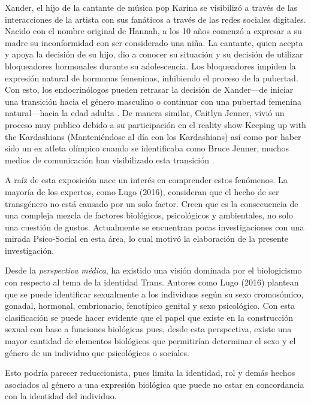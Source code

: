 Xander, el hijo de la cantante de música pop Karina se visibilizó a través de
las interacciones de la artista con sus fanáticos a través de las redes sociales
digitales. Nacido con el nombre original de Hannah, a los 10 años comenzó a
expresar a su madre su inconformidad con ser considerado una niña. La cantante,
quien acepta y apoya la decisión de su hijo, dio a conocer su situación y su
decisión de utilizar bloqueadores hormonales durante su adolescencia. Los
bloqueadores impiden la expresión natural de hormonas femeninas, inhibiendo el
proceso de la pubertad. Con esto, los endocrinólogos pueden retrasar la decisión
de Xander—de iniciar una transición hacia el género masculino o continuar con
una pubertad femenina natural—hacia la edad adulta
\parencites{Alvarado2016,Vistazo2017}. De manera similar, Caitlyn Jenner, vivió
un proceso muy publico debido a su participación en el reality show Keeping up
with the Kardashians (Manteniéndose al día con los Kardashians) así como por
haber sido un ex atleta olímpico cuando se identificaba como Bruce Jenner,
muchos medios de comunicación han visibilizado esta transición
\parencite{Castro2015}.

A raíz de esta exposición nace un interés en comprender estos fenómenos.
La mayoría de los expertos, como Lugo (2016), consideran que el hecho de ser
transgénero no está causado por un solo factor.
Creen que es la consecuencia de una compleja mezcla de factores biológicos,
psicológicos y ambientales, no solo una cuestión de gustos.
Actualmente se encuentran pocas investigaciones con una mirada Psico-Social en
esta área, lo cual motivó la elaboración de la presente investigación.

Desde la \emph{perspectiva médica}, ha existido una visión dominada por el
biologicismo con respecto al tema de la identidad Trans.
Autores como Lugo (2016) plantean que se puede identificar sexualmente a los
individuos según su sexo cromosómico, gonadal, hormonal, embrionario, fenotípico
genital y sexo psicológico.
Con esta clasificación se puede hacer evidente que el papel que existe en la
construcción sexual con base a funciones biológicas pues, desde esta
perspectiva, existe una mayor cantidad de elementos biológicos que
permitirían determinar el sexo y el género de un individuo que psicológicos o
sociales.

Esto podría parecer reduccionista, pues limita la identidad, rol y demás hechos
asociados al género a una expresión biológica que puede no estar en concordancia
con la identidad del individuo.

